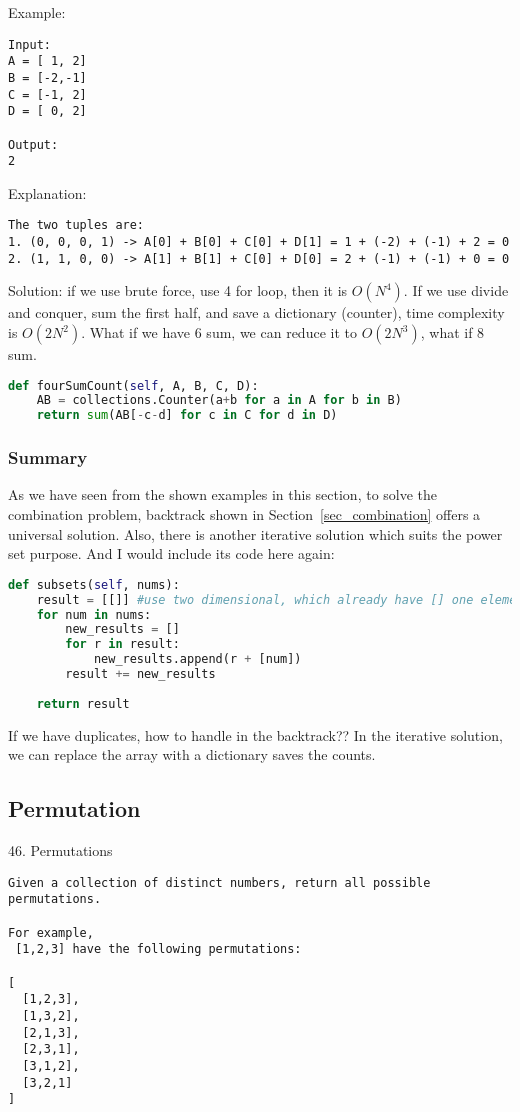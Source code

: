 \documentclass[../../question_3_array_question.tex]{subfiles}
\begin{document}
Example:
\begin{lstlisting}
Input:
A = [ 1, 2]
B = [-2,-1]
C = [-1, 2]
D = [ 0, 2]

Output:
2
\end{lstlisting}

Explanation:

\begin{lstlisting}
The two tuples are:
1. (0, 0, 0, 1) -> A[0] + B[0] + C[0] + D[1] = 1 + (-2) + (-1) + 2 = 0
2. (1, 1, 0, 0) -> A[1] + B[1] + C[0] + D[0] = 2 + (-1) + (-1) + 0 = 0
\end{lstlisting}
Solution: if we use brute force, use 4 for loop, then it is $O(N^4)$. If we use divide and conquer, sum the first half, and save a dictionary (counter), time complexity is $O(2N^2)$. What if we have 6 sum, we can reduce it to $O(2N^3)$, what if 8 sum.

\begin{lstlisting}[language = Python]
def fourSumCount(self, A, B, C, D):
    AB = collections.Counter(a+b for a in A for b in B)
    return sum(AB[-c-d] for c in C for d in D)
\end{lstlisting}


\subsubsection{Summary}
As we have seen from the shown examples in this section, to solve the combination problem, backtrack shown in Section~\ref{sec_combination} offers a universal solution. Also, there is another iterative solution which suits the power set purpose. And I would include its code here again:
\begin{lstlisting}[language = Python]
def subsets(self, nums):
    result = [[]] #use two dimensional, which already have [] one element
    for num in nums:
        new_results = []
        for r in result:
            new_results.append(r + [num])
        result += new_results
        
    return result
\end{lstlisting}
If we have duplicates, how to handle in the backtrack?? In the iterative solution, we can replace the array with a dictionary saves the counts. 

\subsection{Permutation}
46. Permutations
\begin{lstlisting}
Given a collection of distinct numbers, return all possible permutations.

For example,
 [1,2,3] have the following permutations:

[
  [1,2,3],
  [1,3,2],
  [2,1,3],
  [2,3,1],
  [3,1,2],
  [3,2,1]
]
\end{lstlisting}
\end{document}
